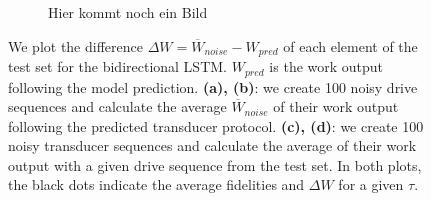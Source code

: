 \begin{figure}[h]
\begin{subfigure}{0.4\textwidth}
		\centering
		Hier kommt noch ein Bild
	\end{subfigure}
	\caption{We plot the difference $\Delta W = \overline{W}_{noise} - W_{pred}$ of each element of the test set for the bidirectional LSTM. $W_{pred}$ is the work output following the model prediction. \textbf{(a), (b)}: we create 100 noisy drive sequences and calculate the average $\overline{W}_{noise}$ of their work output following the predicted transducer protocol. \textbf{(c), (d)}: we create 100 noisy transducer sequences and calculate the average of their work output with a given drive sequence from the test set. In both plots, the black dots indicate the average fidelities and $\Delta W$ for a given $\tau$.}
	\label{noisedt5}
\end{figure}